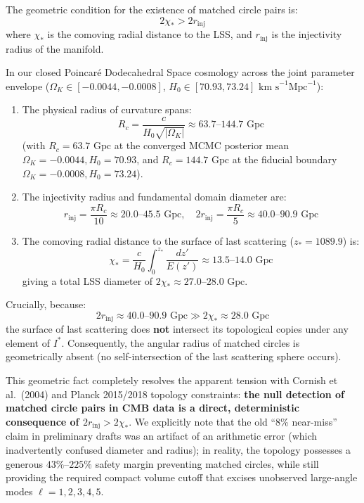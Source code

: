 \documentclass[11pt,a4paper]{article}
\theoremstyle{definition}
\begin{document}
The geometric condition for the existence of matched circle pairs is:
\begin{equation}
2\chi_* > 2 r_{\mathrm{inj}}
\end{equation}
where $\chi_*$ is the comoving radial distance to the LSS, and $r_{\mathrm{inj}}$ is the injectivity radius of the manifold.

In our closed Poincar\'e Dodecahedral Space cosmology across the joint parameter envelope ($\Omega_K \in [-0.0044, -0.0008]$, $H_0 \in [70.93, 73.24]\text{ km s}^{-1}\text{Mpc}^{-1}$):
\begin{enumerate}
    \item The physical radius of curvature spans:
    \begin{equation}
    R_c = \frac{c}{H_0 \sqrt{|\Omega_K|}} \approx 63.7\text{--}144.7\text{ Gpc}
    \end{equation}
    (with $R_c = 63.7\text{ Gpc}$ at the converged MCMC posterior mean $\Omega_K = -0.0044, H_0 = 70.93$, and $R_c = 144.7\text{ Gpc}$ at the fiducial boundary $\Omega_K = -0.0008, H_0 = 73.24$).
    \item The injectivity radius and fundamental domain diameter are:
    \begin{equation}
    r_{\mathrm{inj}} = \frac{\pi R_c}{10} \approx 20.0\text{--}45.5\text{ Gpc}, \quad 2 r_{\mathrm{inj}} = \frac{\pi R_c}{5} \approx 40.0\text{--}90.9\text{ Gpc}
    \end{equation}
    \item The comoving radial distance to the surface of last scattering ($z_* = 1089.9$) is:
    \begin{equation}
    \chi_* = \frac{c}{H_0} \int_0^{z_*} \frac{dz'}{E(z')} \approx 13.5\text{--}14.0\text{ Gpc}
    \end{equation}
    giving a total LSS diameter of $2\chi_* \approx 27.0\text{--}28.0\text{ Gpc}$.
\end{enumerate}

Crucially, because:
\begin{equation}
2 r_{\mathrm{inj}} \approx 40.0\text{--}90.9\text{ Gpc} \gg 2\chi_* \approx 28.0\text{ Gpc}
\end{equation}
the surface of last scattering does \textbf{not} intersect its topological copies under any element of $I^*$. Consequently, the angular radius of matched circles is geometrically absent (no self-intersection of the last scattering sphere occurs).

This geometric fact completely resolves the apparent tension with Cornish et al.\ (2004) and Planck 2015/2018 topology constraints: \textbf{the null detection of matched circle pairs in CMB data is a direct, deterministic consequence of $2 r_{\mathrm{inj}} > 2\chi_*$}. We explicitly note that the old ``8\% near-miss'' claim in preliminary drafts was an artifact of an arithmetic error (which inadvertently confused diameter and radius); in reality, the topology possesses a generous $43\%\text{--}225\%$ safety margin preventing matched circles, while still providing the required compact volume cutoff that excises unobserved large-angle modes $\ell = 1, 2, 3, 4, 5$.
\end{document}
